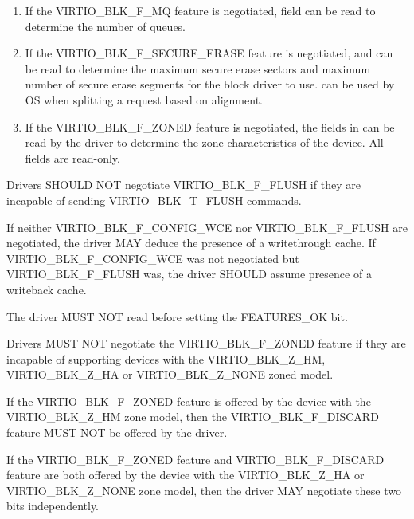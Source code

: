 \begin{enumerate}
\item If the VIRTIO_BLK_F_MQ feature is negotiated,  field
    can be read to determine the number of queues.

\item If the VIRTIO_BLK_F_SECURE_ERASE feature is negotiated,
     and  can be read
    to determine the maximum secure erase sectors and maximum number of
    secure erase segments for the block driver to use.
     can be used by OS when splitting a
    request based on alignment.

\item If the VIRTIO_BLK_F_ZONED feature is negotiated, the fields in
     can be read by the driver to determine the zone
    characteristics of the device. All  fields are read-only.

\end{enumerate}


Drivers SHOULD NOT negotiate VIRTIO_BLK_F_FLUSH if they are incapable of
sending VIRTIO_BLK_T_FLUSH commands.

If neither VIRTIO_BLK_F_CONFIG_WCE nor VIRTIO_BLK_F_FLUSH are
negotiated, the driver MAY deduce the presence of a writethrough cache.
If VIRTIO_BLK_F_CONFIG_WCE was not negotiated but VIRTIO_BLK_F_FLUSH was,
the driver SHOULD assume presence of a writeback cache.

The driver MUST NOT read  before setting
the FEATURES_OK  bit.

Drivers MUST NOT negotiate the VIRTIO_BLK_F_ZONED feature if they are incapable
of supporting devices with the VIRTIO_BLK_Z_HM, VIRTIO_BLK_Z_HA or
VIRTIO_BLK_Z_NONE zoned model.

If the VIRTIO_BLK_F_ZONED feature is offered by the device with the
VIRTIO_BLK_Z_HM zone model, then the VIRTIO_BLK_F_DISCARD feature MUST NOT be
offered by the driver.

If the VIRTIO_BLK_F_ZONED feature and VIRTIO_BLK_F_DISCARD feature are both
offered by the device with the VIRTIO_BLK_Z_HA or VIRTIO_BLK_Z_NONE zone model,
then the driver MAY negotiate these two bits independently.

